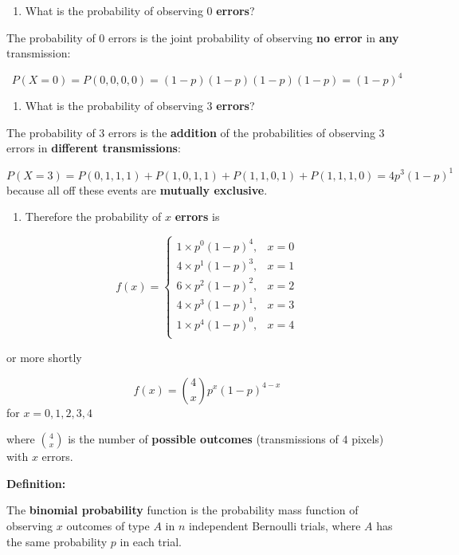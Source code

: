 \documentclass[
]{book}
\providecommand{\tightlist}{%
  \setlength{\itemsep}{0pt}\setlength{\parskip}{0pt}}
\begin{document}
\begin{enumerate}
\def\labelenumi{\arabic{enumi})}
\setcounter{enumi}{1}
\tightlist
\item
  What is the probability of observing \(0\) \textbf{errors}?
\end{enumerate}

The probability of \(0\) errors is the joint probability of observing \textbf{no error} in \textbf{any} transmission:

\[P(X=0)=P(0,0,0,0)=(1-p)(1-p)(1-p)(1-p)=(1-p)^4\]

\begin{enumerate}
\def\labelenumi{\arabic{enumi})}
\setcounter{enumi}{2}
\tightlist
\item
  What is the probability of observing \(3\) \textbf{errors}?
\end{enumerate}

The probability of \(3\) errors is the \textbf{addition} of the probabilities of observing \(3\) errors in \textbf{different transmissions}:

\[P(X=3)=P(0,1,1,1)+P(1,0,1,1)+P(1,1,0,1)+P(1,1,1,0)=4p^3(1-p)^1\]
because all off these events are \textbf{mutually exclusive}.

\begin{enumerate}
\def\labelenumi{\arabic{enumi})}
\setcounter{enumi}{3}
\tightlist
\item
  Therefore the probability of \(x\) \textbf{errors} is
\end{enumerate}

\[
    f(x)= 
\begin{cases}
    1\times p^0(1-p)^4,&  x=0 \\
    4\times p^1(1-p)^3,&  x=1 \\
    6\times p^2(1-p)^2,&  x=2 \\
    4\times p^3(1-p)^1,&  x=3 \\
    1\times p^4(1-p)^0,&  x=4 \\
\end{cases}
\]

or more shortly

\[f(x)=\binom 4 x p^x(1-p)^{4-x}\]
for \(x=0,1,2,3,4\)

where \(\binom 4 x\) is the number of \textbf{possible outcomes} (transmissions of \(4\) pixels) with \(x\) errors.

\textbf{Definition:}

The \textbf{binomial probability} function is the probability mass function of observing \(x\) outcomes of type \(A\) in \(n\) independent Bernoulli trials, where \(A\) has the same probability \(p\) in each trial.
\end{document}
